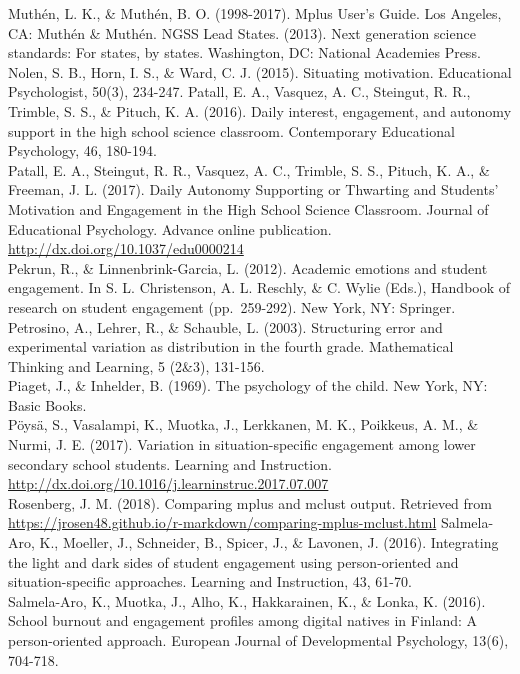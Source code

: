 \documentclass[]{msu-thesis}
\theoremstyle{definition}
\theoremstyle{definition}
\theoremstyle{definition}
\theoremstyle{remark}
\begin{document}
Muthén, L. K., \& Muthén, B. O. (1998-2017). Mplus User's Guide. Los
Angeles, CA: Muthén \& Muthén. NGSS Lead States. (2013). Next generation
science standards: For states, by states. Washington, DC: National
Academies Press.\\
Nolen, S. B., Horn, I. S., \& Ward, C. J. (2015). Situating motivation.
Educational Psychologist, 50(3), 234-247. Patall, E. A., Vasquez, A. C.,
Steingut, R. R., Trimble, S. S., \& Pituch, K. A. (2016). Daily
interest, engagement, and autonomy support in the high school science
classroom. Contemporary Educational Psychology, 46, 180-194.\\
Patall, E. A., Steingut, R. R., Vasquez, A. C., Trimble, S. S., Pituch,
K. A., \& Freeman, J. L. (2017). Daily Autonomy Supporting or Thwarting
and Students' Motivation and Engagement in the High School Science
Classroom. Journal of Educational Psychology. Advance online
publication. \url{http://dx.doi.org/10.1037/edu0000214}\\
Pekrun, R., \& Linnenbrink-Garcia, L. (2012). Academic emotions and
student engagement. In S. L. Christenson, A. L. Reschly, \& C. Wylie
(Eds.), Handbook of research on student engagement (pp.~259-292). New
York, NY: Springer. Petrosino, A., Lehrer, R., \& Schauble, L. (2003).
Structuring error and experimental variation as distribution in the
fourth grade. Mathematical Thinking and Learning, 5 (2\&3), 131-156.\\
Piaget, J., \& Inhelder, B. (1969). The psychology of the child. New
York, NY: Basic Books.\\
Pöysä, S., Vasalampi, K., Muotka, J., Lerkkanen, M. K., Poikkeus, A. M.,
\& Nurmi, J. E. (2017). Variation in situation-specific engagement among
lower secondary school students. Learning and Instruction.
\url{http://dx.doi.org/10.1016/j.learninstruc.2017.07.007}\\
Rosenberg, J. M. (2018). Comparing mplus and mclust output. Retrieved
from
\url{https://jrosen48.github.io/r-markdown/comparing-mplus-mclust.html}
Salmela-Aro, K., Moeller, J., Schneider, B., Spicer, J., \& Lavonen, J.
(2016). Integrating the light and dark sides of student engagement using
person-oriented and situation-specific approaches. Learning and
Instruction, 43, 61-70.\\
Salmela-Aro, K., Muotka, J., Alho, K., Hakkarainen, K., \& Lonka, K.
(2016). School burnout and engagement profiles among digital natives in
Finland: A person-oriented approach. European Journal of Developmental
Psychology, 13(6), 704-718.\\
\end{document}
